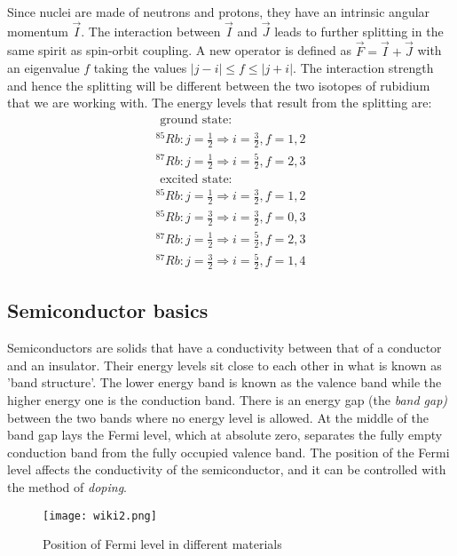 \documentclass{article}
\begin{document}
Since nuclei are made of neutrons and protons, they have an intrinsic angular momentum $\vec{I}$. The interaction between $\vec{I}$ and $\vec{J}$ leads to further splitting in the same spirit as spin-orbit coupling. A new operator is defined as $\vec{F} = \vec{I}+\vec{J}$ with an eigenvalue $f$ taking the values $|j-i| \leq f \leq|j+i|$. The interaction strength and hence the splitting will be different between the two isotopes of rubidium that we are working with. The energy levels that result from the splitting are: 
\begin{equation}
    \begin{gathered}
\text { ground state: } \\
{ }^{85} R b: j=\frac{1}{2} \Rightarrow i=\frac{3}{2}, f=1,2 \\
{ }^{87} R b: j=\frac{1}{2} \Rightarrow i=\frac{5}{2}, f=2,3 \\
\text { excited state: } \\
{ }^{85} R b: j=\frac{1}{2} \Rightarrow i=\frac{3}{2}, f=1,2 \\
{ }^{85} R b: j=\frac{3}{2} \Rightarrow i=\frac{3}{2}, f=0,3 \\
{ }^{87} R b: j=\frac{1}{2} \Rightarrow i=\frac{5}{2}, f=2,3 \\
{ }^{87} R b: j=\frac{3}{2} \Rightarrow i=\frac{5}{2}, f=1,4
\end{gathered}
\end{equation}

\subsection{Semiconductor basics}
Semiconductors are solids that have a conductivity between that of a conductor and an insulator. Their energy levels sit close to each other in what is known as 'band structure'. The lower energy band is known as the valence band while the higher energy one is the conduction band. There is an energy gap (the \textit{band gap)} between the two bands where no energy level is allowed. At the middle of the band gap lays the Fermi level, which at absolute zero, separates the fully empty conduction band from the fully occupied valence band. The position of the Fermi level affects the conductivity of the semiconductor, and it can be controlled with the method of \textit{doping}.
\begin{figure}[H]
    \centering
    \texttt{[image: wiki2.png]}
    \caption{Position of Fermi level in different materials \cite{wikipediacontributors_2019_semiconductor}}
    \label{fig:enter-label}
\end{figure}
\end{document}
